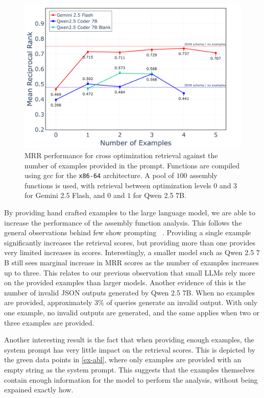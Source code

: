 \begin{figure}
\centerline{\includegraphics[width=\linewidth]{../graphs/examples-ablation}}
\caption{MRR performance for cross optimization retrieval against the number of examples provided in the prompt. Functions are compiled
using gcc for the \texttt{x86-64} architecture. A pool of \(100\) assembly functions is used, with retrieval between optimization levels \(0\) and \(3\)
for Gemini 2.5 Flash, and \(0\) and \(1\) for Qwen 2.5 \(7\)B.}
\label{ex-abl}
\end{figure}

By providing hand crafted examples to the large language model, we are able to increase the performance of the assembly function analysis.
This follows the general observations behind few show prompting ~\cite{few-shot}. Providing a single example significantly increases the retrieval
scores, but providing more than one provides very limited increases in scores. Interestingly, a smaller model such as Qwen 2.5 \(7\)B still sees
marginal increase in MRR scores as the number of examples increases up to three. This relates to our previous observation
that small LLMs rely more on the provided examples than larger models. Another evidence of this is the number of invalid JSON outputs generated by
Qwen 2.5 \(7\)B. When no examples are provided, approximately \(3\%\) of queries generate an invalid output. With only one example, no invalid
outputs are generated, and the same applies when two or three examples are provided.

Another interesting result is the fact that when providing enough examples, the system prompt has very little impact on the retrieval scores.
This is depicted by the green data points in \autoref{ex-abl}, where only examples are provided with an empty string as the system prompt.
This suggests that the examples themselves contain enough information for the model to perform the analysis, without being expained 
exactly how.

